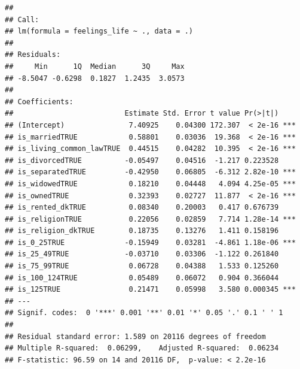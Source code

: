 \documentclass[]{article}
\begin{document}
\begin{verbatim}
## 
## Call:
## lm(formula = feelings_life ~ ., data = .)
## 
## Residuals:
##     Min      1Q  Median      3Q     Max 
## -8.5047 -0.6298  0.1827  1.2435  3.0573 
## 
## Coefficients:
##                          Estimate Std. Error t value Pr(>|t|)    
## (Intercept)               7.40925    0.04300 172.307  < 2e-16 ***
## is_marriedTRUE            0.58801    0.03036  19.368  < 2e-16 ***
## is_living_common_lawTRUE  0.44515    0.04282  10.395  < 2e-16 ***
## is_divorcedTRUE          -0.05497    0.04516  -1.217 0.223528    
## is_separatedTRUE         -0.42950    0.06805  -6.312 2.82e-10 ***
## is_widowedTRUE            0.18210    0.04448   4.094 4.25e-05 ***
## is_ownedTRUE              0.32393    0.02727  11.877  < 2e-16 ***
## is_rented_dkTRUE          0.08340    0.20003   0.417 0.676739    
## is_religionTRUE           0.22056    0.02859   7.714 1.28e-14 ***
## is_religion_dkTRUE        0.18735    0.13276   1.411 0.158196    
## is_0_25TRUE              -0.15949    0.03281  -4.861 1.18e-06 ***
## is_25_49TRUE             -0.03710    0.03306  -1.122 0.261840    
## is_75_99TRUE              0.06728    0.04388   1.533 0.125260    
## is_100_124TRUE            0.05489    0.06072   0.904 0.366044    
## is_125TRUE                0.21471    0.05998   3.580 0.000345 ***
## ---
## Signif. codes:  0 '***' 0.001 '**' 0.01 '*' 0.05 '.' 0.1 ' ' 1
## 
## Residual standard error: 1.589 on 20116 degrees of freedom
## Multiple R-squared:  0.06299,    Adjusted R-squared:  0.06234 
## F-statistic: 96.59 on 14 and 20116 DF,  p-value: < 2.2e-16
\end{verbatim}
\end{document}
